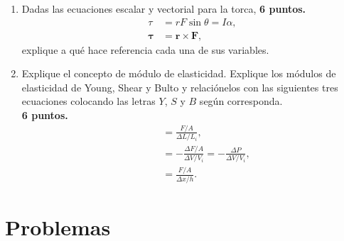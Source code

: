 \documentclass{article}
\begin{document}
\begin{enumerate}
\item Dadas las ecuaciones escalar y vectorial para la torca,
\hfill \textbf{6 puntos.}
\begin{align}
\tau &= rF \sin \theta = I\alpha, \\
\boldsymbol{\tau} &= \boldsymbol{r} \times \boldsymbol{F},
\end{align}
explique a qué hace referencia cada una de sus variables.

\item Explique el concepto de módulo de elasticidad. Explique los módulos de
elasticidad de Young, Shear y Bulto y relaciónelos con las siguientes tres
ecuaciones colocando las letras $Y$, $S$ y $B$ según corresponda. \\

\hfill \textbf{6 puntos.}
\begin{align}
\qquad &=  \frac{F/A}{\Delta L/L_{i}}, \\
\qquad &= -\frac{\Delta F/A }{\Delta V / V_{i}} 
= -\frac{\Delta P}{\Delta V / V_{i}}, \\
\qquad &=  \frac{F/A}{\Delta x / h}. 
\end{align}

\end{enumerate}


\section{Problemas} %
\label{sec:problemas}
\end{document}
